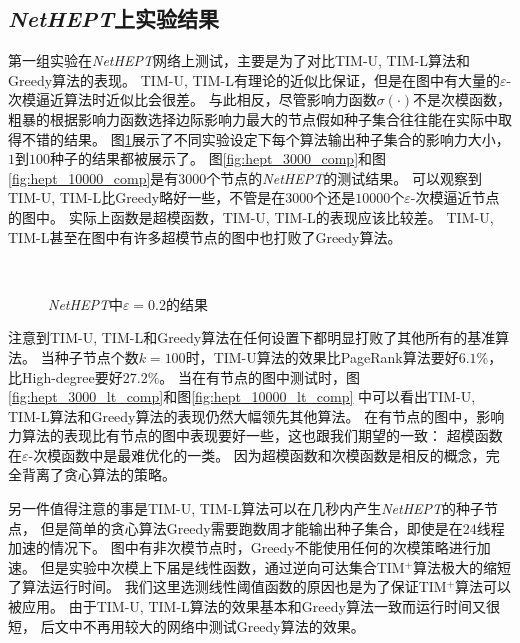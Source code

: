 \subsection{{\em NetHEPT}上实验结果}
第一组实验在{\em NetHEPT}网络上测试，主要是为了对比{\sf TIM-U, TIM-L}算法和{\sf Greedy}算法的表现。
{\sf TIM-U, TIM-L}有理论的近似比保证，但是在图中有大量的$\varepsilon$-次模逼近算法时近似比会很差。
与此相反，尽管影响力函数$\sigma(\cdot)$不是次模函数，
粗暴的根据影响力函数选择边际影响力最大的节点假如种子集合往往能在实际中取得不错的结果。
图\ref{fig:NetHEPT_comp}展示了不同实验设定下每个算法输出种子集合的影响力大小，$1$到$100$种子的结果都被展示了。
图\ref{fig:hept_3000_comp}和图\ref{fig:hept_10000_comp}是有$3000$个\easso 节点的{\em NetHEPT}的测试结果。
可以观察到{\sf TIM-U, TIM-L}比{\sf Greedy}略好一些，不管是在$3000$个还是$10000$个$\varepsilon$-次模逼近节点的图中。
实际上\easso 函数是超模函数，{\sf TIM-U, TIM-L}的表现应该比较差。
{\sf TIM-U, TIM-L}甚至在图中有许多超模节点的图中也打败了{\sf Greedy}算法。

\begin{figure}[h]
\centering
	\\
	
	\caption{{\em NetHEPT}中$\varepsilon=0.2$的结果}
	\label{fig:NetHEPT_comp}
\end{figure}


注意到{\sf TIM-U, TIM-L}和{\sf Greedy}算法在任何设置下都明显打败了其他所有的基准算法。
当种子节点个数$k=100$时，{\sf TIM-U}算法的效果比{\sf PageRank}算法要好$6.1\%$，比{\sf High-degree}要好$27.2\%$。
当在有\easst 节点的图中测试时，图\ref{fig:hept_3000_lt_comp}和图\ref{fig:hept_10000_lt_comp}
中可以看出{\sf TIM-U, TIM-L}算法和{\sf Greedy}算法的表现仍然大幅领先其他算法。
在有\easst 节点的图中，影响力算法的表现比有\easso 节点的图中表现要好一些，这也跟我们期望的一致：
超模函数在$\varepsilon$-次模函数中是最难优化的一类。
因为超模函数和次模函数是相反的概念，完全背离了贪心算法的策略。


另一件值得注意的事是{\sf TIM-U, TIM-L}算法可以在几秒内产生{\em NetHEPT}的种子节点，
但是简单的贪心算法{\sf Greedy}需要跑数周才能输出种子集合，即使是在$24$线程加速的情况下。
图中有非次模节点时，{\sf Greedy}不能使用任何的次模策略进行加速。
但是实验中次模上下届是线性函数，通过逆向可达集合{\sf TIM$^+$}算法极大的缩短了算法运行时间。
我们这里选测线性阈值函数的原因也是为了保证{\sf TIM$^+$}算法可以被应用。
由于{\sf TIM-U, TIM-L}算法的效果基本和{\sf Greedy}算法一致而运行时间又很短，
后文中不再用较大的网络中测试{\sf Greedy}算法的效果。


